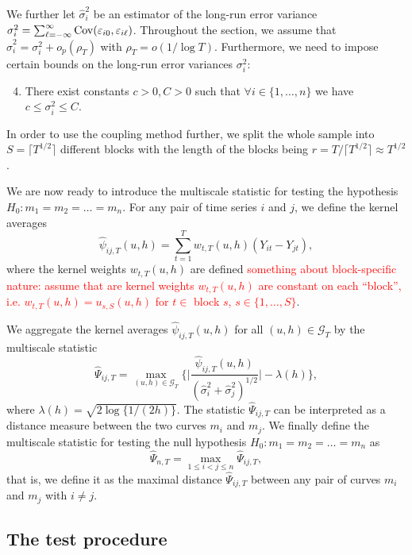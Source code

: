 \documentclass[a4paper,12pt]{article}
\begin{document}
We further let $\widehat{\sigma}_i^2$ be an estimator of the long-run error variance $\sigma_i^2 = \sum\nolimits_{\ell=-\infty}^{\infty} \textnormal{Cov}(\varepsilon_{i0}, \varepsilon_{i\ell})$. Throughout the section, we assume that $\widehat{\sigma}_i^2 = \sigma_i^2 + o_p(\rho_T)$ with $\rho_T = o(1/\log T)$. Furthermore, we need to impose certain bounds on the long-run error variances $\sigma_i^2$:
\begin{enumerate}[label=(C\arabic*),leftmargin=1.05cm]
\setcounter{enumi}{3}
\item \label{C-var} There exist constants $c>0, C>0$ such that $\forall i\in \{1, \ldots, n\}$ we have $c \le \sigma_i^2 \le C$.
\end{enumerate}

In order to use the coupling method further, we split the whole sample into $S = \lceil T^{1/2} \rceil$ different blocks with the length of the blocks being $r = T / \lceil T^{1/2} \rceil \approx T^{1/2} $.

We are now ready to introduce the multiscale statistic for testing the hypothesis $H_0: m_1 = m_2 = \ldots = m_n$. For any pair of time series $i$ and $j$, we define the kernel averages
\[ \widehat{\psi}_{ij,T}(u,h) = \sum\limits_{t=1}^T w_{t,T}(u,h)({Y}_{it} - {Y}_{jt}), \]
where the kernel weights $w_{t,T}(u,h)$ are defined \textcolor{red}{something about block-specific nature: assume that are kernel weights $w_{t, T}(u, h)$ are constant on each ``block'', i.e. $w_{t, T}(u, h) = u_{s, S}(u, h)$ for $t\in$ block $s$, $s \in \{1, \ldots, S\}$}.

We aggregate the kernel averages $\widehat{\psi}_{ij,T}(u,h)$ for all $(u,h) \in \mathcal{G}_T$ by the multiscale statistic 
\[ \widehat{\Psi}_{ij,T} = \max_{(u,h) \in \mathcal{G}_T} \Big\{ \Big|\frac{\widehat{\psi}_{ij,T}(u,h)}{(\widehat{\sigma}_i^2 + \widehat{\sigma}_j^2)^{1/2}}\Big| - \lambda(h) \Big\}, \] 
where $\lambda(h) = \sqrt{2 \log \{ 1/(2h) \}}$. The statistic $\widehat{\Psi}_{ij,T}$ can be interpreted as a distance measure between the two curves $m_i$ and $m_j$. We finally define the multiscale statistic for testing the null hypothesis $H_0: m_1 =m_2 = \ldots = m_n$ as
\[ \widehat{\Psi}_{n,T} = \max_{1 \le i < j \le n} \widehat{\Psi}_{ij,T}, \]
that is, we define it as the maximal distance $\widehat{\Psi}_{ij,T}$ between any pair of curves $m_i$ and $m_j$ with $i \ne j$. 


\subsection{The test procedure}\label{subsec-test-equality-test}
\end{document}

